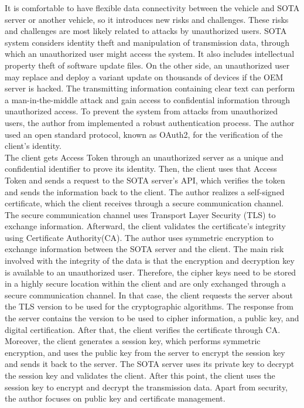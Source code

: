 \documentclass[12pt,a4paper]{article}
\begin{document}
It is comfortable to have flexible data connectivity between the vehicle and SOTA server or another vehicle, so it introduces new risks and challenges. These risks and challenges are most likely related to attacks by unauthorized users. SOTA system considers identity theft and manipulation of transmission data, through which an unauthorized user might access the system. It also includes intellectual property theft of software update files. On the other side, an unauthorized user may replace and deploy a variant update on thousands of devices if the OEM server is hacked. The transmitting information containing clear text can perform a man-in-the-middle attack and gain access to confidential information through unauthorized access. To prevent the system from attacks from unauthorized users, the author from \cite{r28} implemented a robust authentication process. The author used an open standard protocol, known as OAuth2, for the verification of the client's identity. \cite{r28} \\

The client gets Access Token through an unauthorized server as a unique and confidential identifier to prove its identity. Then, the client uses that Access Token and sends a request to the SOTA server's API, which verifies the token and sends the information back to the client. The author realizes a self-signed certificate, which the client receives through a secure communication channel. The secure communication channel uses Transport Layer Security (TLS) to exchange information. Afterward, the client validates the certificate's integrity using Certificate Authority(CA). The author uses symmetric encryption to exchange information between the SOTA server and the client. The main risk involved with the integrity of the data is that the encryption and decryption key is available to an unauthorized user. Therefore, the cipher keys need to be stored in a highly secure location within the client and are only exchanged through a secure communication channel. In that case, the client requests the server about the TLS version to be used for the cryptographic algorithms. The response from the server contains the version to be used to cipher information, a public key, and digital certification. After that, the client verifies the certificate through CA. Moreover, the client generates a session key, which performs symmetric encryption, and uses the public key from the server to encrypt the session key and sends it back to the server. The SOTA server uses its private key to decrypt the session key and validates the client. After this point,  the client uses the session key to encrypt and decrypt the transmission data. Apart from security, the author focuses on public key and certificate management. \cite{r28} \\
\end{document}
